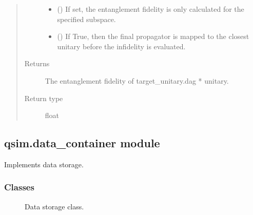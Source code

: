 \documentclass[letterpaper,10pt,english]{sphinxmanual}
\begin{document}
\begin{fulllineitems}
\begin{quote}
\begin{description}
\begin{itemize}
\item {} 
 (\sphinxstyleliteralemphasis{\sphinxupquote{{[}}}\sphinxstyleliteralemphasis{\sphinxupquote{{[}}}\sphinxstyleliteralemphasis{\sphinxupquote{{]}}}\sphinxstyleliteralemphasis{\sphinxupquote{{]}}}) \textendash{} If set, the entanglement fidelity is only calculated for the specified
subspace.

\item {} 
 () \textendash{} If True, then the final propagator is mapped to the closest unitary
before the infidelity is evaluated.

\end{itemize}

\item[{Returns}] \leavevmode
{} \textendash{} The entanglement fidelity of target\_unitary.dag * unitary.

\item[{Return type}] \leavevmode
float

\end{description}\end{quote}

\end{fulllineitems}



\subsection{qsim.data\_container module}
\label{\detokenize{qsim:module-qsim.data_container}}\label{\detokenize{qsim:qsim-data-container-module}}
Implements data storage.


\subsubsection{Classes}
\label{\detokenize{qsim:id8}}\begin{description}
\item[{{\hyperref[\detokenize{qsim:qsim.data_container.DataContainer}]{}}}] \leavevmode
Data storage class.

\end{description}
\end{document}
